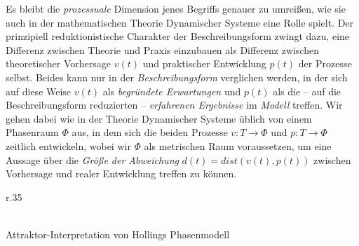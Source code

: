 \documentclass[12pt,a4paper]{article}
\begin{document}
Es bleibt die \emph{prozessuale} Dimension jenes Begriffs genauer zu umreißen,
wie sie auch in der mathematischen Theorie Dynamischer Systeme eine Rolle
spielt. Der prinzipiell reduktionistische Charakter der Beschreibungsform
zwingt dazu, eine Differenz zwischen Theorie und Praxis einzubauen als
Differenz zwischen theoretischer Vorhersage $v(t)$ und praktischer Entwicklung
$p(t)$ der Prozesse selbst.  Beides kann nur in der \emph{Beschreibungsform}
verglichen werden, in der sich auf diese Weise $v(t)$ als \emph{begründete
  Erwartungen} und $p(t)$ als die -- auf die Beschreibungsform reduzierten --
\emph{erfahrenen Ergebnisse} im \emph{Modell} treffen.  Wir gehen dabei wie in
der Theorie Dynamischer Systeme üblich von einem Phasenraum $\Phi$ aus, in dem
sich die beiden Prozesse $v:T\longrightarrow\Phi$ und $p:T\longrightarrow\Phi$
zeitlich entwickeln, wobei wir $\Phi$ als metrischen Raum voraussetzen, um
eine Aussage über die \emph{Größe der Abweichung} $d(t)=dist(v(t),p(t))$
zwischen Vorhersage und realer Entwicklung treffen zu können.

\begin{wrapfigure}[17]{r}{.35\textwidth}
\begin{center}
  \\[1em]
  Attraktor-Interpretation von Hollings Phasenmodell
\end{center}
\end{wrapfigure}
\end{document}
